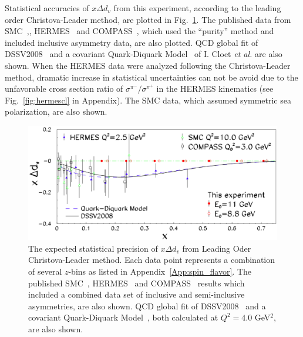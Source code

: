 Statistical accuracies of $x \Delta d_v$ from this experiment, according to the
leading order Christova-Leader method, are plotted in Fig.~\ref{fig:xqvlo1}.
The published data from SMC~\cite{Adeva:1997qz},, 
HERMES~\cite{Airapetian:2004zf} and COMPASS~\cite{Alekseev:2010ub}, which used the ``purity'' method and included inclusive asymmetry data, are also plotted.
QCD global fit of DSSV2008~\cite{DSSV2008} and a covariant Quark-Diquark Model~\cite{Cloet:2005pp} of I. Cloet {\it et al.} are also shown.
When the HERMES data were analyzed following the Christova-Leader method, dramatic increase
in statistical uncertainties can not be avoid due to the unfavorable cross section
ratio of $\sigma^{\pi^-}/ \sigma^{\pi^+}$ in the HERMES kinematics (see Fig.~\ref{fig:hermescl}
 in Appendix).  
 The SMC data, which assumed symmetric sea polarization, are also shown.  
\begin{figure}[htbp]
\centering
    \includegraphics[width=0.98\linewidth]{figs_xj/xdeltadv_1pannel_052814.pdf}
\caption{\label{fig:xqvlo1} The expected statistical precision of $x \Delta d_v$ from Leading Oder Christova-Leader method.  Each data point represents a combination of several $z$-bins as listed in Appendix~\ref{App:spin_flavor}.
The published SMC~\cite{Adeva:1997qz}, HERMES~\cite{Airapetian:2004zf} and COMPASS~\cite{Alekseev:2010ub}  
 results which 
included a combined data set of inclusive and semi-inclusive asymmetries, are also shown. QCD global fit of DSSV2008~\cite{DSSV2008} and a covariant Quark-Diquark Model~\cite{Cloet:2005pp}, both calculated at $Q^2=4.0$ GeV$^2$,  are also shown.
}
\end{figure}



